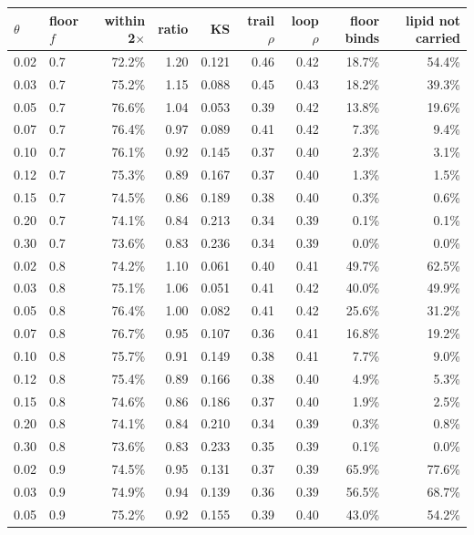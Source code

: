 \begin{table}[htbp]
\centering
{\small
\begin{tabular}{llrrrrrrr}
\hline
$\theta$ & floor $f$ & within 2$\times$ & ratio & KS & trail $\rho$ & loop $\rho$ & floor binds & lipid not carried \\
\hline
0.02 & 0.7 & 72.2\% & 1.20 & 0.121 & 0.46 & 0.42 & 18.7\% & 54.4\% \\
0.03 & 0.7 & 75.2\% & 1.15 & 0.088 & 0.45 & 0.43 & 18.2\% & 39.3\% \\
0.05 & 0.7 & 76.6\% & 1.04 & 0.053 & 0.39 & 0.42 & 13.8\% & 19.6\% \\
0.07 & 0.7 & 76.4\% & 0.97 & 0.089 & 0.41 & 0.42 & 7.3\% & 9.4\% \\
0.10 & 0.7 & 76.1\% & 0.92 & 0.145 & 0.37 & 0.40 & 2.3\% & 3.1\% \\
0.12 & 0.7 & 75.3\% & 0.89 & 0.167 & 0.37 & 0.40 & 1.3\% & 1.5\% \\
0.15 & 0.7 & 74.5\% & 0.86 & 0.189 & 0.38 & 0.40 & 0.3\% & 0.6\% \\
0.20 & 0.7 & 74.1\% & 0.84 & 0.213 & 0.34 & 0.39 & 0.1\% & 0.1\% \\
0.30 & 0.7 & 73.6\% & 0.83 & 0.236 & 0.34 & 0.39 & 0.0\% & 0.0\% \\
\hline
0.02 & 0.8 & 74.2\% & 1.10 & 0.061 & 0.40 & 0.41 & 49.7\% & 62.5\% \\
0.03 & 0.8 & 75.1\% & 1.06 & 0.051 & 0.41 & 0.42 & 40.0\% & 49.9\% \\
0.05 & 0.8 & 76.4\% & 1.00 & 0.082 & 0.41 & 0.42 & 25.6\% & 31.2\% \\
0.07 & 0.8 & 76.7\% & 0.95 & 0.107 & 0.36 & 0.41 & 16.8\% & 19.2\% \\
0.10 & 0.8 & 75.7\% & 0.91 & 0.149 & 0.38 & 0.41 & 7.7\% & 9.0\% \\
0.12 & 0.8 & 75.4\% & 0.89 & 0.166 & 0.38 & 0.40 & 4.9\% & 5.3\% \\
0.15 & 0.8 & 74.6\% & 0.86 & 0.186 & 0.37 & 0.40 & 1.9\% & 2.5\% \\
0.20 & 0.8 & 74.1\% & 0.84 & 0.210 & 0.34 & 0.39 & 0.3\% & 0.8\% \\
0.30 & 0.8 & 73.6\% & 0.83 & 0.233 & 0.35 & 0.39 & 0.1\% & 0.0\% \\
\hline
0.02 & 0.9 & 74.5\% & 0.95 & 0.131 & 0.37 & 0.39 & 65.9\% & 77.6\% \\
0.03 & 0.9 & 74.9\% & 0.94 & 0.139 & 0.36 & 0.39 & 56.5\% & 68.7\% \\
0.05 & 0.9 & 75.2\% & 0.92 & 0.155 & 0.39 & 0.40 & 43.0\% & 54.2\% \\

\end{tabular}}
\end{table}
